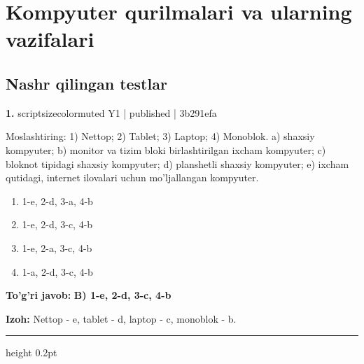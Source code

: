 \documentclass[10pt,a4paper]{article}
\begin{document}
\section{Kompyuter qurilmalari va ularning vazifalari}
\subsection{Nashr qilingan testlar}

{\bfseries\sffamily\color{ink} 1.} {scriptsizecolor{muted} Y1 | published | 3b291efa}
\par
Moslashtiring: 1) Nettop; 2) Tablet; 3) Laptop; 4) Monoblok. a) shaxsiy kompyuter; b) monitor va tizim bloki birlashtirilgan ixcham kompyuter; c) bloknot tipidagi shaxsiy kompyuter; d) planshetli shaxsiy kompyuter; e) ixcham qutidagi, internet ilovalari uchun mo'ljallangan kompyuter.
\begin{enumerate}[label=\Alph*),leftmargin=9mm]
\item 1-e, 2-d, 3-a, 4-b
\item 1-e, 2-d, 3-c, 4-b
\item 1-e, 2-a, 3-c, 4-b
\item 1-a, 2-d, 3-c, 4-b
\end{enumerate}
\begin{tcolorbox}[enhanced,breakable,colback=teal!4,colframe=teal!60!black,boxrule=0.45pt,arc=1.2mm,left=2.7mm,right=2.7mm,top=1.8mm,bottom=1.8mm,before skip=2mm,after skip=2mm]
{\bfseries\sffamily\color{teal}To'g'ri javob:} \textbf{B) 1-e, 2-d, 3-c, 4-b}
\par\smallskip
{\bfseries Izoh:} Nettop - e, tablet - d, laptop - c, monoblok - b.
\end{tcolorbox}
\vspace{2mm}\hrule height 0.2pt\vspace{3mm}
\end{document}

